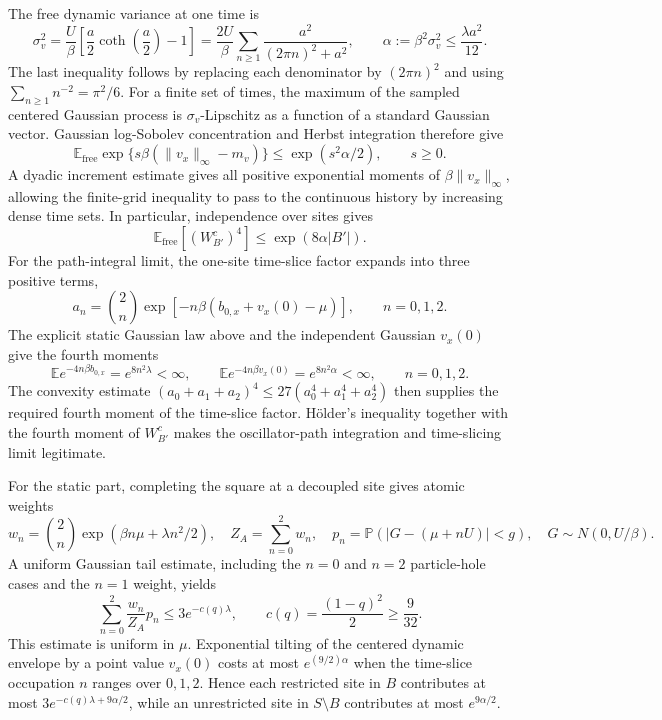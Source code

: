 \documentclass[11pt]{article}
\theoremstyle{remark}
\newcommand{\E}{\mathbb{E}}
\newcommand{\free}{\mathrm{free}}
\begin{document}
The free dynamic variance at one time is
\[
 \sigma_v^2=\frac{U}{\beta}\left[\frac a2\coth\!\left(\frac a2\right)-1\right]
 =\frac{2U}{\beta}\sum_{n\ge1}\frac{a^2}{(2\pi n)^2+a^2},
 \qquad \alpha:=\beta^2\sigma_v^2\le\frac{\lambda a^2}{12}.
\]
The last inequality follows by replacing each denominator by $(2\pi n)^2$ and using $\sum_{n\ge1}n^{-2}=\pi^2/6$. For a finite set of times, the maximum of the sampled centered Gaussian process is $\sigma_v$-Lipschitz as a function of a standard Gaussian vector. Gaussian log-Sobolev concentration and Herbst integration therefore give
\[
 \E_{\free}\exp\{s\beta(\|v_x\|_\infty-m_v)\}\le \exp(s^2\alpha/2),\qquad s\ge0.
\]
A dyadic increment estimate gives all positive exponential moments of $\beta\|v_x\|_\infty$, allowing the finite-grid inequality to pass to the continuous history by increasing dense time sets. In particular, independence over sites gives
\[
 \E_{\free}[(W^c_{B'})^4]\le\exp(8\alpha|B'|).
\]
For the path-integral limit, the one-site time-slice factor expands into three positive terms,
\[
 a_n=\binom 2n\exp[-n\beta(b_{0,x}+v_x(0)-\mu)],\qquad n=0,1,2.
\]
The explicit static Gaussian law above and the independent Gaussian $v_x(0)$ give the fourth moments
\[
 \E e^{-4n\beta b_{0,x}}=e^{8n^2\lambda}<\infty,
 \qquad
 \E e^{-4n\beta v_x(0)}=e^{8n^2\alpha}<\infty,
 \qquad n=0,1,2.
\]
The convexity estimate $(a_0+a_1+a_2)^4\le27(a_0^4+a_1^4+a_2^4)$ then supplies the required fourth moment of the time-slice factor. Hölder's inequality together with the fourth moment of $W^c_{B'}$ makes the oscillator-path integration and time-slicing limit legitimate.

For the static part, completing the square at a decoupled site gives atomic weights
\[
 w_n=\binom 2n\exp(\beta n\mu+\lambda n^2/2),\quad
 Z_A=\sum_{n=0}^2w_n,
 \quad p_n=\mathbb P(|G-(\mu+nU)|<g),\quad G\sim N(0,U/\beta).
\]
A uniform Gaussian tail estimate, including the $n=0$ and $n=2$ particle-hole cases and the $n=1$ weight, yields
\[
 \sum_{n=0}^2\frac{w_n}{Z_A}p_n\le3e^{-c(q)\lambda},
 \qquad c(q)=\frac{(1-q)^2}{2}\ge\frac9{32}.
\]
This estimate is uniform in $\mu$. Exponential tilting of the centered dynamic envelope by a point value $v_x(0)$ costs at most $e^{(9/2)\alpha}$ when the time-slice occupation $n$ ranges over $0,1,2$. Hence each restricted site in $B$ contributes at most $3e^{-c(q)\lambda+9\alpha/2}$, while an unrestricted site in $S\setminus B$ contributes at most $e^{9\alpha/2}$.
\end{document}
